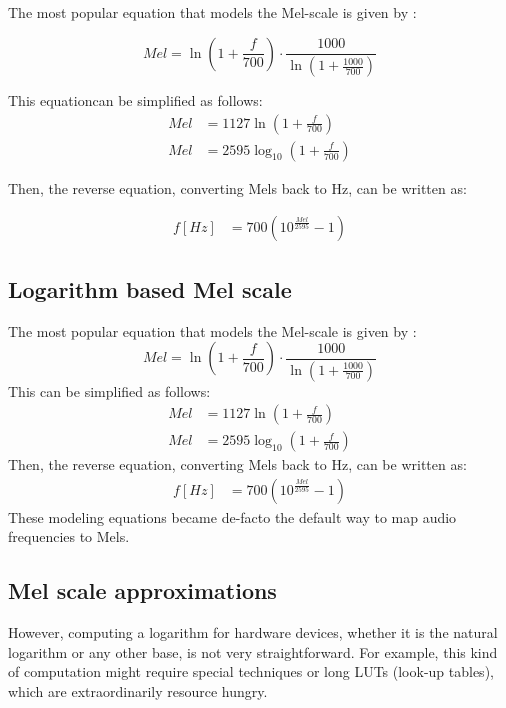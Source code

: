 The most popular equation that models the Mel-scale
is given by \cite{o1987speech}:

\begin{equation}\label{eq:mel_1}
    Mel = \ln \left( 1 + \frac{f}{700} \right) \cdot \frac{1000}{\ln(1+\frac{1000}{700})} 
\end{equation}

This equation\;[\ref{eq:mel_1}] can be simplified as follows:
\begin{align}
    Mel & = 1127 \ln \left( 1 + \frac{f}{700} \right) \nonumber \\
    Mel & = 2595 \log_{10}\left( 1 + \frac{f}{700} \right)
\end{align}

Then, the reverse equation, converting Mels back to Hz,
can be written as:

\begin{align}
    f[Hz] & = 700 \left( 10^{\frac{Mel}{2595}} -1  \right)
\end{align}

\subsection{Logarithm based Mel scale}
The most popular equation that models the Mel-scale
is given by \cite{o1987speech}:
\begin{equation}
    Mel = \ln \left( 1 + \frac{f}{700} \right) \cdot \frac{1000}{\ln(1+\frac{1000}{700})} 
\end{equation}
This can be simplified as follows:
\begin{align}
    Mel & = 1127 \ln \left( 1 + \frac{f}{700} \right) \nonumber \\
    Mel & = 2595 \log_{10}\left( 1 + \frac{f}{700} \right)
\end{align}
Then, the reverse equation, converting Mels back to Hz,
can be written as:
\begin{align}
    f[Hz] & = 700 \left( 10^{\frac{Mel}{2595}} -1  \right)
\end{align}
These modeling equations became de-facto the default way to
map audio frequencies to Mels.

\subsection{Mel scale approximations}

However, computing a logarithm for hardware devices, 
whether it is the natural logarithm or any other base, 
is not very straightforward.
For example, this kind of computation might require special
techniques or long LUTs (look-up tables),
which are extraordinarily resource hungry.


